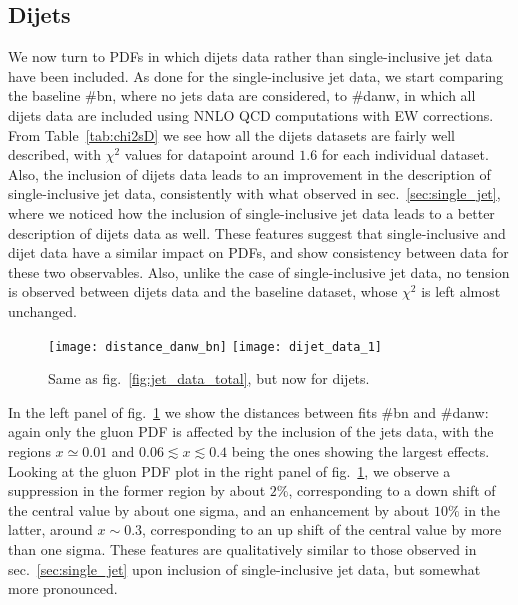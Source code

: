 \subsection{Dijets}
We now turn to PDFs in which dijets data rather than single-inclusive jet data have been included.
As done for the single-inclusive jet data, we start comparing the baseline \#bn, where no jets data are considered,
to \#danw, in which all dijets data are included using NNLO QCD computations with EW corrections.
From Table~\ref{tab:chi2sD} we see how all the dijets datasets are fairly well described, with $\chi^2$ values for datapoint
around $1.6$ for each individual dataset. Also, the inclusion of dijets data leads to an improvement in the description
of single-inclusive jet data, consistently with what observed in sec.~\ref{sec:single_jet}, where 
we noticed how the inclusion of single-inclusive jet data leads to a better description of dijets data as well.
These features suggest that single-inclusive and dijet data have a similar impact on PDFs, and show consistency
between data for these two observables. 
%
Also, unlike the case of single-inclusive jet data, no tension is observed between dijets data and the baseline dataset,
whose $\chi^2$ is left almost unchanged.
\begin{figure}[!t]
    \centering
    \texttt{[image: distance\_danw\_bn]}
    \texttt{[image: dijet\_data\_1]}\\
    \caption{Same as fig.~\ref{fig:jet_data_total}, but now for dijets.}
    \label{fig:dijet_data_total}
\end{figure}

%
In the left panel of fig.~\ref{fig:dijet_data_total} we show the distances between fits \#bn and \#danw: again only
the gluon PDF is affected by the inclusion of the jets data, with the regions $x\simeq 0.01$ and $0.06\lesssim x \lesssim 0.4$
being the ones showing the largest effects.
Looking at the gluon PDF plot in the right panel of fig.~\ref{fig:dijet_data_total}, we observe a suppression in the former region
by about $2\%$, corresponding to a down shift of the central value by about one sigma, and an enhancement by about $10\%$
in the latter, around $x\sim 0.3$, corresponding to an up shift of the central value by more than one sigma.
%
These features are qualitatively similar to those observed in sec.~\ref{sec:single_jet} upon inclusion of single-inclusive jet
data, but somewhat more pronounced.    

